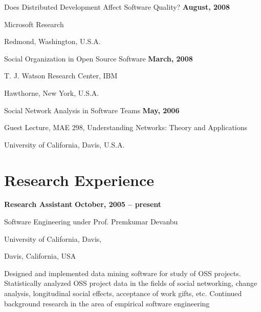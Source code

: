 \documentclass[margin,line,article]{res}
\newenvironment{list1}{
  \begin{list}{}{%
      \setlength{\itemsep}{0in}
      \setlength{\parsep}{0in} \setlength{\parskip}{0in}
      \setlength{\topsep}{0in} \setlength{\partopsep}{0in} 
      \setlength{\leftmargin}{0.17in}}}{\end{list}}
\begin{document}
\begin{resume}
Does Distributed Development Affect Software Quality? \hfill \textbf{August, 2008}\\
\vspace{-10pt}
\begin{list1}
\item Microsoft Research
\item Redmond, Washington, U.S.A.
\end{list1}

Social Organization in Open Source Software \hfill \textbf{March, 2008}\\
\vspace{-10pt}
\begin{list1}
\item T. J. Watson Research Center, IBM
\item Hawthorne, New York, U.S.A.
\end{list1}

Social Network Analysis in Software Teams \hfill \textbf{May, 2006}\\
\vspace{-10pt}
\begin{list1}
\item Guest Lecture, MAE 298, Understanding Networks: Theory and Applications
\item University of California, Davis, U.S.A.
\end{list1}

\section{Research Experience}
\textbf{Research Assistant} \hfill \textbf{October, 2005 -- present}\\
\vspace{-10pt}
\begin{list1}
\item Software Engineering under Prof. Premkumar Devanbu
\item University of California, Davis,
\item Davis, California, USA
\vspace{6pt}
\item Designed and implemented data mining software for study of OSS projects. Statistically 
analyzed OSS project data in the fields of social networking, change analysis, 
longitudinal social effects, acceptance of work gifts, etc. Continued background research in the 
area of empirical software engineering 
\end{list1}


\end{resume}
\end{document}
